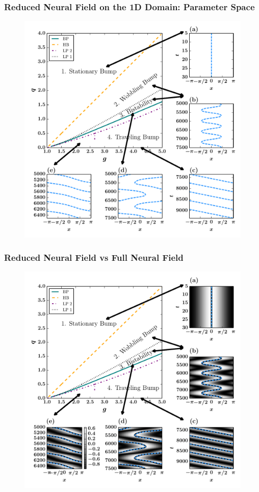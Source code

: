\documentclass{beamer}
\begin{document}
\begin{frame}
\frametitle{Reduced Neural Field on the 1D Domain: Parameter Space}
\begin{figure}
 \includegraphics[width=.6\textwidth]{oned_phase_2par5.pdf}
\end{figure}
\end{frame}

\begin{frame}
\frametitle{Reduced Neural Field vs Full Neural Field}
\begin{figure}
 \includegraphics[width=.6\textwidth]{oned_phase_2par5b.pdf}
\end{figure}
\end{frame}
\end{document}
